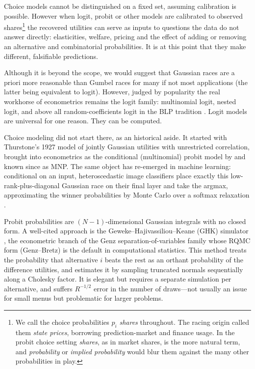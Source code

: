 \documentclass[12pt]{article}
\theoremstyle{remark}
\begin{document}
Choice models cannot be distinguished on a fixed set, assuming calibration is possible. However when logit,  probit or other models are calibrated to observed shares\footnote{We call the choice probabilities $p_i$ \emph{shares} throughout. The racing origin \citep{cotton2021} called them \emph{state prices}, borrowing prediction-market and finance usage. In the probit choice setting \emph{shares}, as in market shares, is the more natural term, and \emph{probability} or \emph{implied probability} would blur them against the many other probabilities in play.} the recovered utilities can serve as inputs to questions the data do not answer
directly: elasticities, welfare,
pricing and the effect of adding or removing an alternative and combinatorial probabilities. It is at this point that they make different, falsifiable predictions. 

Although it is beyond the scope, we would suggest that Gaussian races are a priori more reasonable than Gumbel races for many if not most applications (the latter being equivalent to logit). However, judged by popularity the real workhorse of econometrics remains the logit family: multinomial logit,
nested logit, and above all random-coefficients logit in the BLP tradition
\citep{berry1995,train2009,conlon2020}. Logit models are universal for one reason.
They can be computed.

Choice modeling did not start there, as an historical aside. It started with Thurstone's 1927 model
\citep{thurstone1927} of jointly Gaussian utilities with unrestricted
correlation, brought into econometrics as the conditional (multinomial)
probit model by \citet{hausman1978} and known since as MNP. The same
object has re-emerged in machine learning: conditional on an input,
heteroscedastic image classifiers place exactly this
low-rank-plus-diagonal Gaussian race on their final layer and take the
argmax, approximating the winner probabilities by Monte Carlo over a
softmax relaxation \citep{collier2021}.

Probit probabilities are $(N-1)$-dimensional Gaussian integrals with no
closed form. A well-cited approach is the Geweke--Hajivassiliou--Keane
(GHK) simulator \citep{geweke1994,hajivassiliou1998,train2009}, the
econometric branch of the Genz separation-of-variables family
\citep{genz1992} whose RQMC form (Genz--Bretz) is the default in
computational statistics.  This method treats
the probability that alternative $i$ beats the rest as an orthant
probability of the difference utilities, and estimates it by sampling
truncated normals sequentially along a Cholesky factor. It is elegant but requires a separate simulation per alternative, and suffers $R^{-1/2}$ error in
the number of draws---not usually an issue for small menus but problematic for larger problems. 
\end{document}
